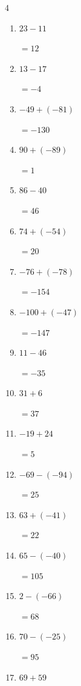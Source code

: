 \begin{multicols}{4}
\begin{enumerate}
        $=-111$

  \item $23-11$

        $=12$

  \item $13-17$

        $=-4$

  \item $-49+(-81)$

        $=-130$

  \item $90+(-89)$

        $=1$

  \item $86-40$

        $=46$

  \item $74+(-54)$

        $=20$

  \item $-76+(-78)$

        $=-154$

  \item $-100+(-47)$

        $=-147$

  \item $11-46$

        $=-35$

  \item $31+6$

        $=37$

  \item $-19+24$

        $=5$

  \item $-69-(-94)$

        $=25$

  \item $63+(-41)$

        $=22$

  \item $65-(-40)$

        $=105$

  \item $2-(-66)$

        $=68$

  \item $70-(-25)$

        $=95$

\columnbreak %

  \item $69+59$


\end{enumerate}
\end{multicols}
